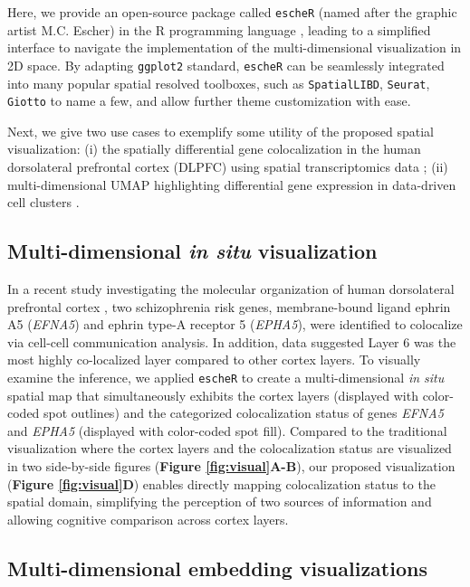 \documentclass[10pt,twocolumn]{article}
\begin{document}
Here, we provide an open-source package called \texttt{escheR} (named after the graphic artist M.C. Escher) in the R programming language \cite{R}, leading to a simplified interface to navigate the implementation of the multi-dimensional visualization in 2D space. By adapting \texttt{ggplot2} standard, \texttt{escheR} can be seamlessly integrated into many popular spatial resolved toolboxes, such as \texttt{SpatialLIBD}\cite{pardo_2022}, \texttt{Seurat}\cite{hao_2021}, \texttt{Giotto}\cite{dries_2021} to name a few, and allow further theme customization with ease.

Next, we give two use cases to exemplify some utility of the proposed spatial visualization: (i) the spatially differential gene colocalization in the human dorsolateral prefrontal cortex (DLPFC) using spatial transcriptomics data \cite{huukimyers_2023}; (ii) multi-dimensional UMAP highlighting differential gene expression in data-driven cell clusters \cite{freytag_2020}. 



\subsection{Multi-dimensional \textit{in situ} visualization}
In a recent study investigating the molecular organization of human dorsolateral prefrontal cortex \cite{huukimyers_2023}, two schizophrenia risk genes, membrane-bound ligand ephrin A5 (\textit{EFNA5}) and ephrin type-A receptor 5 (\textit{EPHA5}), were identified to colocalize via cell-cell communication analysis. In addition, data suggested Layer 6 was the most highly co-localized layer compared to other cortex layers. To visually examine the inference, we applied \texttt{escheR} to create a multi-dimensional \textit{in situ} spatial map that simultaneously exhibits the cortex layers (displayed with color-coded spot outlines) and the categorized colocalization status of genes \textit{EFNA5} and \textit{EPHA5} (displayed with color-coded spot fill). Compared to the traditional visualization where the cortex layers and the colocalization status are visualized in two side-by-side figures (\textbf{Figure \ref{fig:visual}A-B}), our proposed visualization (\textbf{Figure \ref{fig:visual}D}) enables directly mapping colocalization status to the spatial domain, simplifying the perception of two sources of information and allowing cognitive comparison across cortex layers. 

\subsection{Multi-dimensional embedding visualizations}
\end{document}
